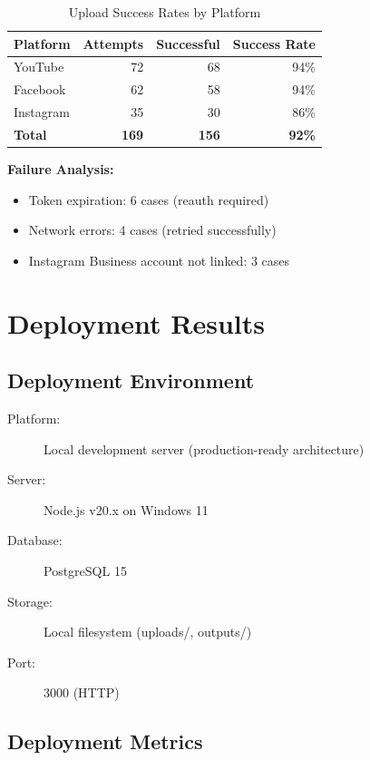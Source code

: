 \begin{table}[H]
\centering
\caption{Upload Success Rates by Platform}
\begin{tabular}{@{}lrrr@{}}
\toprule
\textbf{Platform} & \textbf{Attempts} & \textbf{Successful} & \textbf{Success Rate} \\
\midrule
YouTube & 72 & 68 & 94\% \\
Facebook & 62 & 58 & 94\% \\
Instagram & 35 & 30 & 86\% \\
\midrule
\textbf{Total} & \textbf{169} & \textbf{156} & \textbf{92\%} \\
\bottomrule
\end{tabular}
\end{table}

\textbf{Failure Analysis:}
\begin{itemize}
    \item Token expiration: 6 cases (reauth required)
    \item Network errors: 4 cases (retried successfully)
    \item Instagram Business account not linked: 3 cases
\end{itemize}

\section{Deployment Results}

\subsection{Deployment Environment}

\begin{description}
    \item[Platform:] Local development server (production-ready architecture)
    \item[Server:] Node.js v20.x on Windows 11
    \item[Database:] PostgreSQL 15
    \item[Storage:] Local filesystem (uploads/, outputs/)
    \item[Port:] 3000 (HTTP)
\end{description}

\subsection{Deployment Metrics}

